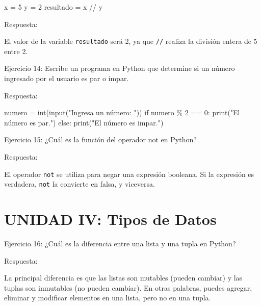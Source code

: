 \documentclass[
  a4paper,
  onepage,
  openany]{scrreprt}
\newenvironment{Shaded}{\begin{snugshade}}{\end{snugshade}}
\newcommand{\BuiltInTok}[1]{\textcolor[rgb]{0.00,0.23,0.31}{#1}}
\newcommand{\ControlFlowTok}[1]{\textcolor[rgb]{0.00,0.23,0.31}{#1}}
\newcommand{\DecValTok}[1]{\textcolor[rgb]{0.68,0.00,0.00}{#1}}
\newcommand{\NormalTok}[1]{\textcolor[rgb]{0.00,0.23,0.31}{#1}}
\newcommand{\OperatorTok}[1]{\textcolor[rgb]{0.37,0.37,0.37}{#1}}
\newcommand{\StringTok}[1]{\textcolor[rgb]{0.13,0.47,0.30}{#1}}
\begin{document}
\begin{Shaded}
\begin{Highlighting}[]
\NormalTok{x }\OperatorTok{=} \DecValTok{5}
\NormalTok{y }\OperatorTok{=} \DecValTok{2}
\NormalTok{resultado }\OperatorTok{=}\NormalTok{ x }\OperatorTok{//}\NormalTok{ y}
\end{Highlighting}
\end{Shaded}

Respuesta:

El valor de la variable \texttt{resultado} será 2, ya que \texttt{//}
realiza la división entera de 5 entre 2.

Ejercicio 14: Escribe un programa en Python que determine si un número
ingresado por el usuario es par o impar.

Respuesta:

\begin{Shaded}
\begin{Highlighting}[]
\NormalTok{numero }\OperatorTok{=} \BuiltInTok{int}\NormalTok{(}\BuiltInTok{input}\NormalTok{(}\StringTok{"Ingresa un número: "}\NormalTok{))}
\ControlFlowTok{if}\NormalTok{ numero }\OperatorTok{\%} \DecValTok{2} \OperatorTok{==} \DecValTok{0}\NormalTok{:}
    \BuiltInTok{print}\NormalTok{(}\StringTok{"El número es par."}\NormalTok{)}
\ControlFlowTok{else}\NormalTok{:}
    \BuiltInTok{print}\NormalTok{(}\StringTok{"El número es impar."}\NormalTok{)}
\end{Highlighting}
\end{Shaded}

Ejercicio 15: ¿Cuál es la función del operador not en Python?

Respuesta:

El operador \texttt{not} se utiliza para negar una expresión booleana.
Si la expresión es verdadera, \texttt{not} la convierte en falsa, y
viceversa.

\hypertarget{unidad-iv-tipos-de-datos}{%
\section{UNIDAD IV: Tipos de Datos}\label{unidad-iv-tipos-de-datos}}

Ejercicio 16: ¿Cuál es la diferencia entre una lista y una tupla en
Python?

Respuesta:

La principal diferencia es que las listas son mutables (pueden cambiar)
y las tuplas son inmutables (no pueden cambiar). En otras palabras,
puedes agregar, eliminar y modificar elementos en una lista, pero no en
una tupla.
\end{document}
